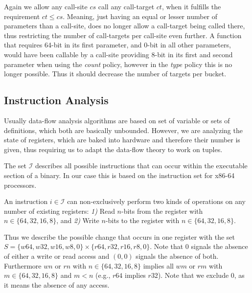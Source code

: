 Again we allow any call-site $cs$ call any call-target $ct$, when it fulfills the requirement $ct \leq cs$. 
Meaning, just having an equal or lesser number of parameters than a call-site, does no longer allow a call-target being called there, thus restricting the number of call-targets per 
call-site even further. A function that requires 64-bit in its first parameter, and 0-bit in all other parameters, would have been callable by a call-site providing 8-bit 
in its first and second parameter when using the \emph{count} policy, however in the \emph{type} policy this is no longer possible. Thus it should decrease the number of targets per bucket.


\subsection{Instruction Analysis}
\label{section:instructionanalysis}
Usually data-flow analysis algorithms are based on set of variable or sets of definitions, which both are basically unbounded. However, we are analyzing the state of registers, which are baked into hardware and therefore their number is given, thus requiring us to adapt the data-flow theory to work on tuples.

The set $\mathcal{I}$ describes all possible instructions that can occur within the executable section of a binary. In our case this is based on the instruction set for x86-64 processors.

An instruction $i \in \mathcal{I}$ can non-exclusively perform two kinds of operations on any number of existing registers:
\textit{1)} Read $n$-bits from the register with $n \in \{ 64, 32, 16, 8 \}$, and
\textit{2)} Write $n$-bits to the register with $n \in \{ 64, 32, 16, 8 \}$.

Thus we describe the possible change that occurs in one register with the set $S = \{ w64, w32, w16, w8, 0 \} \times \{r64, r32, r16, r8, 0 \}$. Note that 0 signals the absence of either a write or read access and $(0, 0)$ signals the absence of both. Furthermore $wn$ or $rn$ with $n \in \{64,32,16,8\}$ implies all $wm$ or $rm$ with $m \in \{64,32,16,8\}$ and $m < n$ (e.g., $r64$ implies $r32$). Note that we exclude 0, as it means the absence of any access.

